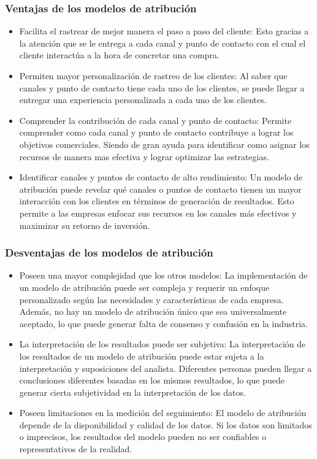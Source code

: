 \subsubsection{Ventajas de los modelos de atribución}

\begin{itemize}
    \item Facilita el rastrear de mejor manera el paso a paso del cliente: Esto gracias a  la atención que se le entrega a cada canal y punto de contacto con el cual el cliente interactúa a la hora de concretar una compra.
    \item Permiten mayor personalización de rastreo de los clientes: Al saber que canales y punto de contacto tiene cada uno de los clientes, se puede llegar a entregar una experiencia personalizada a cada uno de los clientes.
    \item Comprender la contribución de cada canal y punto de contacto: Permite comprender como cada canal y punto de contacto contribuye a lograr los objetivos comerciales. Siendo de gran ayuda para identificar como asignar los recursos de manera mas efectiva y lograr optimizar las estrategias.
    \item Identificar canales y puntos de contacto de alto rendimiento: Un modelo de atribución puede revelar qué canales o puntos de contacto tienen un mayor interacción con los clientes en términos de generación de resultados. Esto permite a las empresas enfocar sus recursos en los canales más efectivos y maximizar su retorno de inversión.
\end{itemize}

\subsubsection{Desventajas de los modelos de atribución}

\begin{itemize}
    \item Poseen una mayor complejidad que los otros modelos: La implementación de un modelo de atribución puede ser compleja y requerir un enfoque personalizado según las necesidades y características de cada empresa. Además, no hay un modelo de atribución único que sea universalmente aceptado, lo que puede generar falta de consenso y confusión en la industria.
    \item La interpretación de los resultados puede ser subjetiva: La interpretación de los resultados de un modelo de atribución puede estar sujeta a la interpretación y suposiciones del analista. Diferentes personas pueden llegar a conclusiones diferentes basadas en los mismos resultados, lo que puede generar cierta subjetividad en la interpretación de los datos.
    \item Poseen limitaciones en la medición del seguimiento: El modelo de atribución depende de la disponibilidad y calidad de los datos. Si los datos son limitados o imprecisos, los resultados del modelo pueden no ser confiables o representativos de la realidad.
\end{itemize}
